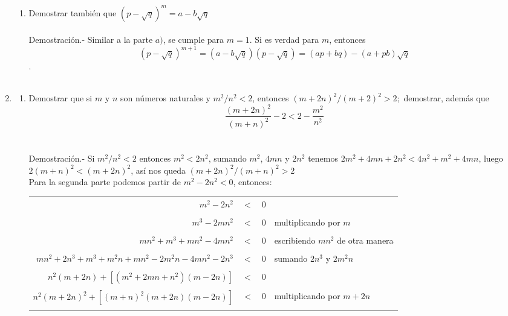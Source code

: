 \begin{enumerate}[\bfseries 1.]
\begin{enumerate}[\bfseries (a)]
      \item Demostrar también que $(p - \sqrt{q})^m = a - b\sqrt{q}$\\\\
      Demostración.- \; Similar a la parte $a)$, se cumple para $m=1$. Si es verdad para $m$, entonces $$(p-\sqrt{q})^{m+1} = (a - b\sqrt{q})(p - \sqrt{q}) = (ap+bq)-(a+pb)\sqrt{q}$$.\\\\
      \end{enumerate}

      \item 
      \begin{enumerate}[\bfseries (a)]
      \item Demostrar que si $m$ \; y \; $n$ son números naturales y $m^2/n^2 < 2$, entonces $\left( m+2n \right)^2 / \left( m + 2 \right)^2 > 2;$ demostrar, además que $$\dfrac{\left( m + 2n \right)^2}{\left( m + n \right)^2} - 2 < 2 - \dfrac{m^2}{n^2}$$\\\\
      Demostración.- \; Si $m^2/n^2 < 2$ entonces $m^2 < 2 n^2$, sumando $m^2$, $4mn$ y $2n^2$ tenemos $2m^2 + 4mn + 2n^2 < 4n^2 + m^2 + 4mn$, luego $2(m+n)^2 < (m+2n)^2$, así nos queda $(m + 2n)^2 / (m+n)^2 > 2$\\
      Para la segunda parte podemos partir de $m^2 - 2n^2<0$, entonces:
      \begin{center}
      \begin{tabular}{r c l l}
      $m^2 - 2n^2$&$<$&$0$&\\\\
      $m^3 - 2mn^2$&$<$&$0$&multiplicando por $m$\\\\
      $mn^2 + m^3 + mn^2 - 4mn^2$&$<$&$0$&escribiendo $mn^2$ de otra manera\\\\
      $mn^2 + 2n^3 + m^3 + m^2 n + mn^2 -2m^2 n - 4mn^2 -2n^3$&$<$&$0$&sumando $2n^3$ y $2m^2 n$\\\\
      $n^2 (m+2n) + \left[ (m^2 + 2mn + n^2)(m-2n) \right]$&$<$&$0$&\\\\
      $ n^2(m+2n)^2  +  \left[ (m+n)^2 (m+2n)(m-2n) \right]$&$<$&$0$&multiplicando por $m+2n$\\\\

\end{tabular}
\end{center}
\end{enumerate}
\end{enumerate}
